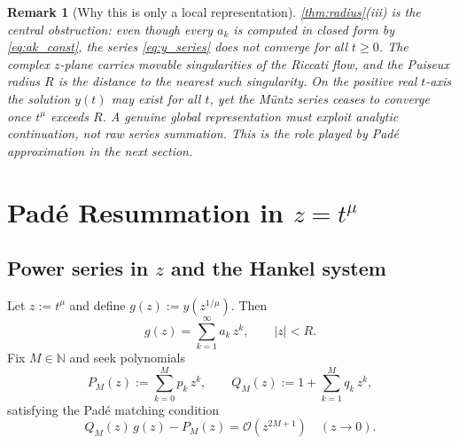 \documentclass[11pt,a4paper]{article}
\newtheorem{remark}[theorem]{Remark}
\newcommand{\N}{\mathbb{N}}
\begin{document}
\begin{remark}[Why this is only a local representation]\label{rem:radius_local}
\cref{thm:radius}(iii) is the central obstruction: even though every \(a_k\) is computed in closed form by \eqref{eq:ak_const}, the series \eqref{eq:y_series} does \emph{not} converge for all \(t\ge0\).
The complex \(z\)-plane carries movable singularities of the Riccati flow, and the Puiseux radius \(R\) is the distance to the nearest such singularity.
On the positive real \(t\)-axis the solution \(y(t)\) may exist for all \(t\), yet the M\"untz series ceases to converge once \(t^\mu\) exceeds \(R\).
A genuine global representation must exploit \emph{analytic continuation}, not raw series summation.
This is the role played by Pad\'e approximation in the next section.
\end{remark}

\section{Pad\'e Resummation in \(z=t^\mu\)}\label{sec:pade}

\subsection{Power series in \(z\) and the Hankel system}

Let \(z:=t^\mu\) and define \(g(z):=y(z^{1/\mu})\). Then
\begin{equation}\label{eq:g_series}
g(z)=\sum_{k=1}^{\infty}a_k\,z^k,\qquad |z|<R.
\end{equation}
Fix \(M\in\N\) and seek polynomials
\[
P_M(z):=\sum_{k=0}^{M}p_k\,z^k,\qquad
Q_M(z):=1+\sum_{k=1}^{M}q_k\,z^k,
\]
satisfying the Pad\'e matching condition
\begin{equation}\label{eq:Pade_match}
Q_M(z)\,g(z)-P_M(z)=\mathcal{O}(z^{2M+1})\quad(z\to 0).
\end{equation}
\end{document}
